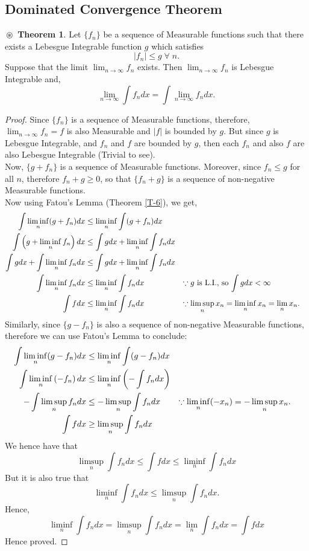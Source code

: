 \documentclass{article}
\theoremstyle{definition}
\newtheorem{theorem}{$\boxed{\boxed{\circledast}}$ Theorem}
\theoremstyle{remark}
\theoremstyle{definition}
\theoremstyle{definition}
\theoremstyle{definition}
\newcommand{\abs}[1]{\left \vert #1\right \vert}
\begin{document}
\subsection{Dominated Convergence Theorem}
\begin{theorem}\label{T-7}
	Let $ \{f_n\} $ be a sequence of Measurable functions such that there exists a Lebesgue Integrable function $ g $ which satisfies
	\[\abs{f_n} \le g \;\forall\;n.\]
	Suppose that the limit $ \lim_{n\to \infty} f_n $ exists. Then $ \lim_{n\to \infty} f_n $ is Lebesgue Integrable and, 
	\[\lim_{n\to \infty} \int f_n dx = \int \lim_{n\to \infty} f_n dx.\]
\end{theorem}
\begin{proof}
	Since $ \{f_n\} $ is a sequence of Measurable functions, therefore, $ \lim_{n\to \infty} f_n = f $ is also Measurable and $ \abs{f} $ is bounded by $ g $. But since $ g $ is Lebesgue Integrable, and $ f_n $ and $ f $ are bounded by $ g $, then each $ f_n $ and also $ f$ are also Lebesgue Integrable (Trivial to see). \\
	Now, $ \{g + f_n\} $ is a sequence of Measurable functions. Moreover, since $ f_n \le g $ for all $ n $, therefore $ f_n + g \ge 0 $, so that $ \{f_n + g\} $ is a sequence of non-negative Measurable functions.\\
	 Now using Fatou's Lemma (Theorem \ref{T-6}), we get,
	\begin{align*}
		\int \liminf_{n} (g+ f_n) dx &\le \liminf_{n} \int (g + f_n) dx\\
		\int \left (g + \liminf_{n} f_n\right ) dx &\le  \int g dx+ \liminf_{n} \int f_n dx\\
		\int gdx + \int \liminf_{n} f_n dx&\le \int gdx + \liminf_{n} \int f_n dx\\
		\int \liminf_{n}f_n dx&\le \liminf_{n} \int f_n dx &&\text{$ \because g$ is L.I., so $ \int gdx < \infty $}\\
		\int f dx &\le \liminf_{n}\int f_n dx&&\text{$ \because \limsup_{n} x_n = \liminf_{n} x_n = \lim_{n} x_n $.}
	\end{align*}
Similarly, since $ \{g - f_n\} $ is also a sequence of non-negative Measurable functions, therefore we can use Fatou's Lemma to conclude:
\begin{align*}
	\int \liminf_{n} (g-f_n) dx &\le \liminf_{n} \int (g-f_n)dx\\
	\int \liminf_{n} \left (-f_n\right )dx&\le \liminf_{n} \left (-\int f_ndx \right )\\
	-\int \limsup_{n} f_n dx&\le - \limsup_{n} \int f_n dx &&\text{$ \because \liminf_{n} (-x_n) = - \limsup_{n} x_n$.}\\
	\int f dx & \ge \limsup_{n} \int f_n dx
\end{align*}
We hence have that 
\[\limsup_{n} \int f_n dx \le \int fdx \le \liminf_{n} \int f_n dx\]
But it is also true that 
\[  \liminf_{n} \int f_n dx \le \limsup_{n}\int f_n dx.\] 
Hence,
\[\liminf_{n} \int f_n dx = \limsup_{n} \int f_n dx = \lim_{n} \int f_n dx = \int fdx\]
Hence proved.
\end{proof}
\end{document}
